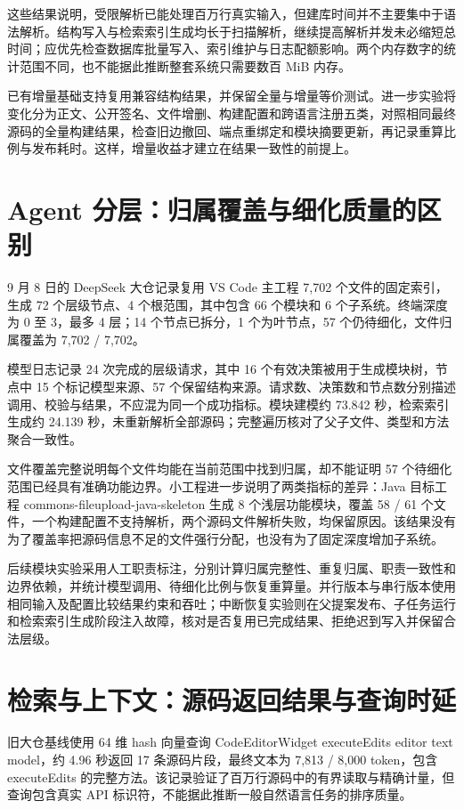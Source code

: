 这些结果说明，受限解析已能处理百万行真实输入，但建库时间并不主要集中于语法解析。结构写入与检索索引生成均长于扫描解析，继续提高解析并发未必缩短总时间；应优先检查数据库批量写入、索引维护与日志配额影响。两个内存数字的统计范围不同，也不能据此推断整套系统只需要数百 MiB 内存。

已有增量基础支持复用兼容结构结果，并保留全量与增量等价测试。进一步实验将变化分为正文、公开签名、文件增删、构建配置和跨语言注册五类，对照相同最终源码的全量构建结果，检查旧边撤回、端点重绑定和模块摘要更新，再记录重算比例与发布耗时。这样，增量收益才建立在结果一致性的前提上。

\section{Agent 分层：归属覆盖与细化质量的区别}

9 月 8 日的 DeepSeek 大仓记录复用 VS Code 主工程 7,702 个文件的固定索引，生成 72 个层级节点、4 个根范围，其中包含 66 个模块和 6 个子系统。终端深度为 0 至 3，最多 4 层；14 个节点已拆分，1 个为叶节点，57 个仍待细化，文件归属覆盖为 7,702 / 7,702。

模型日志记录 24 次完成的层级请求，其中 16 个有效决策被用于生成模块树，节点中 15 个标记模型来源、57 个保留结构来源。请求数、决策数和节点数分别描述调用、校验与结果，不应混为同一个成功指标。模块建模约 73.842 秒，检索索引生成约 24.139 秒，未重新解析全部源码；完整遍历核对了父子文件、类型和方法聚合一致性。

文件覆盖完整说明每个文件均能在当前范围中找到归属，却不能证明 57 个待细化范围已经具有准确功能边界。小工程进一步说明了两类指标的差异：Java 目标工程 commons-fileupload-java-skeleton 生成 8 个浅层功能模块，覆盖 58 / 61 个文件，一个构建配置不支持解析，两个源码文件解析失败，均保留原因。该结果没有为了覆盖率把源码信息不足的文件强行分配，也没有为了固定深度增加子系统。

后续模块实验采用人工职责标注，分别计算归属完整性、重复归属、职责一致性和边界依赖，并统计模型调用、待细化比例与恢复重算量。并行版本与串行版本使用相同输入及配置比较结果约束和吞吐；中断恢复实验则在父提案发布、子任务运行和检索索引生成阶段注入故障，核对是否复用已完成结果、拒绝迟到写入并保留合法层级。

\section{检索与上下文：源码返回结果与查询时延}

旧大仓基线使用 64 维 hash 向量查询 CodeEditorWidget executeEdits editor text model，约 4.96 秒返回 17 条源码片段，最终文本为 7,813 / 8,000 token，包含 executeEdits 的完整方法。该记录验证了百万行源码中的有界读取与精确计量，但查询包含真实 API 标识符，不能据此推断一般自然语言任务的排序质量。

